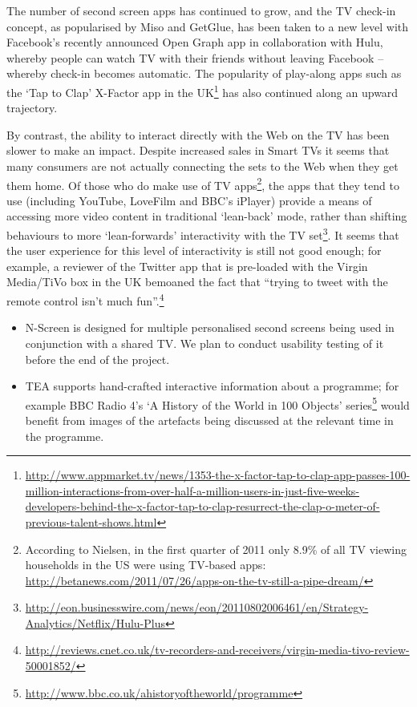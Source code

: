 \documentclass{notube}
\begin{document}
The number of second screen apps has continued to grow, and the TV check-in concept, as popularised by Miso and GetGlue, has been taken to a new level with Facebook’s recently announced Open Graph app in collaboration with Hulu, whereby people can watch TV with their friends without leaving Facebook – whereby check-in becomes automatic. The popularity of play-along apps such as the `Tap to Clap’ X-Factor app in the UK\footnote{\url{http://www.appmarket.tv/news/1353-the-x-factor-tap-to-clap-app-passes-100-million-interactions-from-over-half-a-million-users-in-just-five-weeks-developers-behind-the-x-factor-tap-to-clap-resurrect-the-clap-o-meter-of-previous-talent-shows.html}} has also continued along an upward trajectory. 

By contrast, the ability to interact directly with the Web on the TV has been slower to make an impact. Despite increased sales in Smart TVs it seems that many consumers are not actually connecting the sets to the Web when they get them home. Of those who do make use of TV apps\footnote{According to Nielsen, in the first quarter of 2011 only 8.9\% of all TV viewing households in the US were using TV-based apps: \url{http://betanews.com/2011/07/26/apps-on-the-tv-still-a-pipe-dream/}}, the apps that they tend to use (including YouTube, LoveFilm and BBC’s iPlayer) provide a means of accessing more video content in traditional `lean-back’ mode, rather than shifting behaviours to more `lean-forwards’ interactivity with the TV set\footnote{\url{http://eon.businesswire.com/news/eon/20110802006461/en/Strategy-Analytics/Netflix/Hulu-Plus}}. It seems that the user experience for this level of interactivity is still not good enough; for example, a reviewer of the Twitter app that is pre-loaded with the Virgin Media/TiVo box in the UK bemoaned the fact that ``trying to tweet with the remote control isn’t much fun”.\footnote{\url{http://reviews.cnet.co.uk/tv-recorders-and-receivers/virgin-media-tivo-review-50001852/}}

\begin{itemize}
\item{N-Screen is designed for multiple personalised second screens being used in conjunction with a shared TV. We plan to conduct usability testing of it before the end of the project.}
\item{TEA supports hand-crafted interactive information about a programme; for example BBC Radio 4’s `A History of the World in 100 Objects' series\footnote{\url{http://www.bbc.co.uk/ahistoryoftheworld/programme}} would benefit from images of the artefacts being discussed at the relevant time in the programme.} \end{itemize}
\end{document}

